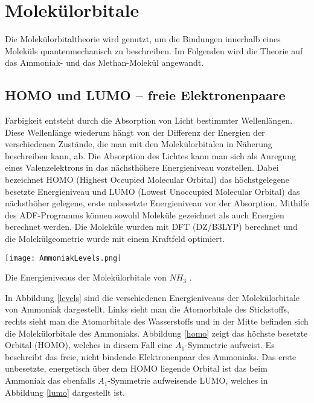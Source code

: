 \section{Molekülorbitale}

Die Molekülorbitaltheorie wird genutzt, um die Bindungen innerhalb eines Moleküls quantenmechanisch zu beschreiben. Im Folgenden wird die Theorie auf das Ammoniak- und das Methan-Molekül angewandt.

\subsection{HOMO und LUMO -- freie Elektronenpaare}

Farbigkeit entsteht durch die Absorption von Licht bestimmter Wellenlängen. Diese Wellenlänge wiederum hängt von der Differenz der Energien der verschiedenen Zustände, die man mit den Molekülorbitalen in Näherung beschreiben kann, ab. 
Die Absorption des Lichtes kann man sich als Anregung eines Valenzelektrons in das nächsthöhere Energieniveau vorstellen. Dabei bezeichnet HOMO (Highest Occupied Molecular Orbital) das höchstgelegene besetzte Energieniveau und LUMO (Lowest Unoccupied Molecular Orbital) das nächsthöher gelegene, erste unbesetzte Energieniveau vor der Absorption. Mithilfe des ADF-Programms können sowohl Moleküle gezeichnet als auch Energien berechnet werden. Die Moleküle wurden mit DFT (DZ/B3LYP) berechnet und die Molekülgeometrie wurde mit einem Kraftfeld optimiert.

\begin{dsafigure}
	\centering
	\texttt{[image: AmmoniakLevels.png]}
	\caption{Die Energieniveaus der Molekülorbitale von $NH_3$ \cite{ADF2017authors}.}
	\label{levels}
\end{dsafigure}

In Abbildung \ref{levels} sind die verschiedenen Energieniveaus der Molekülorbitale von Ammoniak dargestellt. Links sieht man die Atomorbitale des Stickstoffs, rechts sieht man die Atomorbitale des Wasserstoffs und in der Mitte befinden sich die Molekülorbitale des Ammoniaks. Abbildung \ref{homo} zeigt das höchste besetzte Orbital (HOMO), welches in diesem Fall eine $A_1$-Symmetrie aufweist. Es beschreibt das freie, nicht bindende Elektronenpaar des Ammoniaks. Das erste unbesetzte, energetisch über dem HOMO liegende Orbital ist das beim Ammoniak das ebenfalls $A_1$-Symmetrie aufweisende LUMO, welches in Abbildung \ref{lumo} dargestellt ist.

